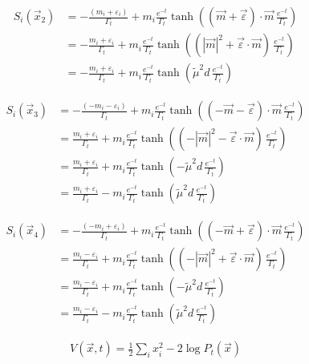 \documentclass[11pt,a4paper]{article}
\begin{document}
\begin{align}
S_i(\vec{x}_2) &= -\frac{(m_i + \varepsilon_i)}{\Gamma_t}+m_i \frac{e^{-t}}{\Gamma_t}\tanh\left( (\vec{m} + \vec{\varepsilon}) \cdot \vec{m} \, \frac{e^{-t}}{\Gamma_t}\right) \\
&= -\frac{m_i + \varepsilon_i}{\Gamma_t}+m_i \frac{e^{-t}}{\Gamma_t}\tanh\left( (|\vec{m}|^2 + \vec{\varepsilon} \cdot \vec{m}) \, \frac{e^{-t}}{\Gamma_t}\right) \\
&= -\frac{m_i + \varepsilon_i}{\Gamma_t}+m_i \frac{e^{-t}}{\Gamma_t}\tanh\left( \tilde{\mu}^2 d \, \frac{e^{-t}}{\Gamma_t}\right)
\end{align}

\begin{align}
S_i(\vec{x}_3) &= -\frac{(-m_i - \varepsilon_i)}{\Gamma_t}+m_i \frac{e^{-t}}{\Gamma_t}\tanh\left( (-\vec{m} - \vec{\varepsilon}) \cdot \vec{m} \, \frac{e^{-t}}{\Gamma_t}\right) \\
&= \frac{m_i + \varepsilon_i}{\Gamma_t}+m_i \frac{e^{-t}}{\Gamma_t}\tanh\left( (-|\vec{m}|^2 - \vec{\varepsilon} \cdot \vec{m}) \, \frac{e^{-t}}{\Gamma_t}\right) \\
&= \frac{m_i + \varepsilon_i}{\Gamma_t}+m_i \frac{e^{-t}}{\Gamma_t}\tanh\left( -\tilde{\mu}^2 d \, \frac{e^{-t}}{\Gamma_t}\right) \\
&= \frac{m_i + \varepsilon_i}{\Gamma_t}-m_i \frac{e^{-t}}{\Gamma_t}\tanh\left( \tilde{\mu}^2 d \, \frac{e^{-t}}{\Gamma_t}\right)
\end{align}

\begin{align}
S_i(\vec{x}_4) &= -\frac{(-m_i + \varepsilon_i)}{\Gamma_t}+m_i \frac{e^{-t}}{\Gamma_t}\tanh\left( (-\vec{m} + \vec{\varepsilon}) \cdot \vec{m} \, \frac{e^{-t}}{\Gamma_t}\right) \\
&= \frac{m_i - \varepsilon_i}{\Gamma_t}+m_i \frac{e^{-t}}{\Gamma_t}\tanh\left( (-|\vec{m}|^2 + \vec{\varepsilon} \cdot \vec{m}) \, \frac{e^{-t}}{\Gamma_t}\right) \\
&= \frac{m_i - \varepsilon_i}{\Gamma_t}+m_i \frac{e^{-t}}{\Gamma_t}\tanh\left( -\tilde{\mu}^2 d \, \frac{e^{-t}}{\Gamma_t}\right) \\
&= \frac{m_i - \varepsilon_i}{\Gamma_t}-m_i \frac{e^{-t}}{\Gamma_t}\tanh\left( \tilde{\mu}^2 d \, \frac{e^{-t}}{\Gamma_t}\right)
\end{align}

\begin{align}
V(\vec{x}, t) = \frac{1}{2}\sum_i x_i^2 - 2\log P_t(\vec{x})
\end{align}
\end{document}

